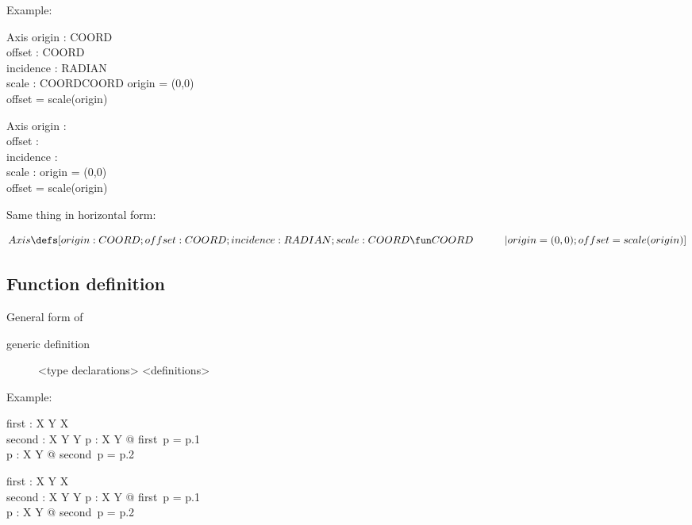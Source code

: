 \documentclass[reqno,12pt]{tufte-handout}
\numberwithin{equation}{subsection}
\numberwithin{equation}{subsection}
\begin{document}
Example:

\begin{marginfigure}[24pt]
  \begin{schema}{Axis}
    origin : COORD \\
    offset : COORD \\
    incidence : RADIAN \\
    scale : COORD\fun COORD
    \where
    origin = (0,0) \\
    offset = scale(origin)
  \end{schema}
\end{marginfigure}
\begin{schema}{Axis}
  origin : \real\cross\real \\
  offset : \real\cross\real \\
  incidence : \real \\
  scale : \real\fun\real
  \where
  origin = (0,0) \\
  offset = scale(origin)
\end{schema}

Same thing in horizontal form:

\[Axis \defs [origin:COORD;offset:COORD;incidence:RADIAN;scale:COORD\fun COORD \\
  \quad\quad\quad | origin=(0,0); offset=scale(origin)]\]


\subsection{Function definition}
\label{subs:zfndefns}

General form of

\begin{description}
\item [generic definition]
\begin{gendef}[X,Y]
  <type declarations>
  \where
  <definitions>
\end{gendef}
\end{description}

Example:

\begin{marginfigure}
  \begin{gendef}[X,Y]
    first : X \cross Y \rightarrow X \\
    second : X \cross Y \rightarrow Y
    \where
    \forall p : X \cross Y @ first\ p = p.1 \\
    \forall p : X \cross Y @ second\ p = p.2
  \end{gendef}
\end{marginfigure}
\begin{gendef}[X,Y]
  first : X \cross Y \rightarrow X \\
  second : X \cross Y \rightarrow Y
  \where
  \forall p : X \cross Y @ first\ p = p.1 \\
  \forall p : X \cross Y @ second\ p = p.2
\end{gendef}
\end{document}
